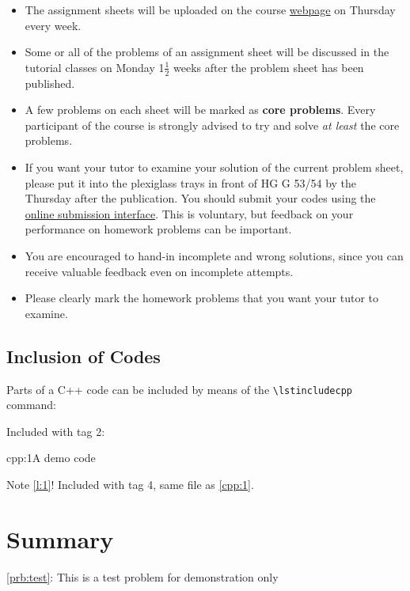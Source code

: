 \documentclass[12pt]{report}
\begin{document}
\begin{itemize}
\item The assignment sheets will be uploaded on the course
  \href{http://www2.math.ethz.ch/education/bachelor/lectures/hs2015/math/nummath_cse/index}{webpage}
  on Thursday every week.
\item Some or all of the problems of an assignment sheet will be discussed in the
  tutorial classes on Monday 1$\frac{1}{2}$ weeks after the problem sheet has been
  published.
\item A few problems on each sheet will be marked as {\bf core problems}. 
  Every participant of the course is strongly advised to try and solve \emph{at least}
  the core problems. 
\item If you want your tutor to examine your solution of the current problem
  sheet, please put it into the plexiglass trays in front of HG G 53/54 by the
  Thursday after the publication. You should submit your codes using the
  \href{https://people.math.ethz.ch/~grsam/submit/}{online submission
    interface}. This is voluntary, but feedback on your performance on homework
  problems can be important.
\item You are encouraged to hand-in incomplete and wrong solutions, since 
  you can receive valuable feedback even on incomplete attempts.
\item Please clearly mark the homework problems that you want your tutor to
  examine.
\end{itemize}






%

\section{Inclusion of Codes}

Parts of a C++ code can be included by means of the \verb|\lstincludecpp| command:

Included with tag 2:

\begin{samcode}[C++ code]{cpp:1}{A demo code}
\end{samcode}

Note \cref{l:1}! Included with tag 4, same file as \cref{cpp:1}.


\chapter{Summary}

\cref{prb:test}: This is a test problem for demonstration only


 

\end{document}
